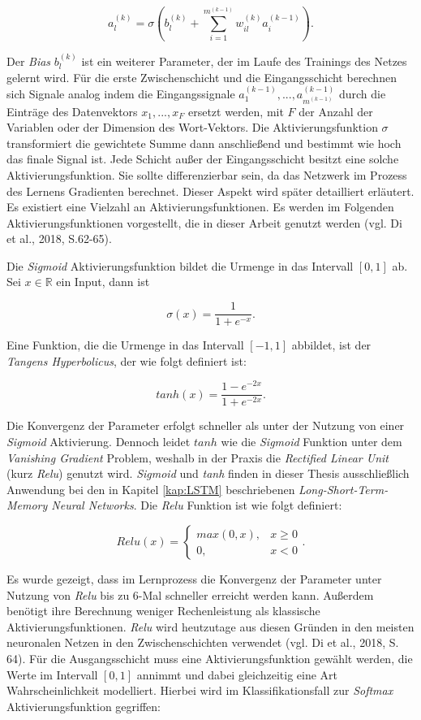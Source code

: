 \documentclass[a4paper,11pt]{article}
\begin{document}
\[ a_{l}^{(k)} = \sigma (b_l^{(k)} + \sum_{i=1}^{m^{(k-1)}} w_{il}^{(k)} a_{i}^{(k-1)}).\]

Der \textit{Bias} $b_l^{(k)}$ ist ein weiterer Parameter, der im Laufe des Trainings des Netzes gelernt wird.
Für die erste Zwischenschicht und die Eingangsschicht berechnen sich Signale analog indem die Eingangssignale $a_{1}^{(k-1)},..., a_{m^{(k-1)}}^{(k-1)}$ durch die Einträge des Datenvektors $x_1, ..., x_F$ ersetzt werden, mit $F$ der Anzahl der Variablen oder der Dimension des Wort-Vektors. Die Aktivierungsfunktion $\sigma$ transformiert die gewichtete Summe dann anschließend und bestimmt wie hoch das finale Signal ist. Jede Schicht außer der Eingangsschicht besitzt eine solche Aktivierungsfunktion. Sie sollte differenzierbar sein, da das Netzwerk im Prozess des Lernens Gradienten berechnet. Dieser Aspekt wird später detailliert erläutert. Es existiert eine Vielzahl an Aktivierungsfunktionen. Es werden im Folgenden Aktivierungsfunktionen vorgestellt, die in dieser Arbeit genutzt werden (vgl. Di et al., 2018, S.62-65). 

Die \textit{Sigmoid} Aktivierungsfunktion bildet die Urmenge in das Intervall $\left[0, 1\right]$ ab. Sei $x \in \mathbb{R}$ ein Input, dann ist 

\[\sigma(x) =  \frac{1}{1+ e^{-x}}.\]

Eine Funktion, die die Urmenge in das Intervall $\left[-1, 1\right]$ abbildet, ist der \textit{Tangens Hyperbolicus}, der wie folgt definiert ist:

\[tanh(x) =  \frac{1- e^{-2x}}{1+ e^{-2x}}.\]


Die Konvergenz der Parameter erfolgt schneller als unter der Nutzung von einer \textit{Sigmoid} Aktivierung. Dennoch leidet $tanh$ wie die \textit{Sigmoid} Funktion unter dem \textit{Vanishing Gradient} Problem, weshalb in der Praxis die \textit{Rectified Linear Unit} (kurz \textit{Relu}) genutzt wird. \textit{Sigmoid} und \textit{tanh} finden in dieser Thesis ausschließlich Anwendung bei den in Kapitel \ref{kap:LSTM} beschriebenen \textit{Long-Short-Term-Memory Neural Networks}. Die \textit{Relu} Funktion ist wie folgt definiert:

\[Relu(x) = 
\begin{cases}
max(0,x), & x \geq 0 \\
0, & x <0
\end{cases}{}
.\]

Es wurde gezeigt, dass im Lernprozess die Konvergenz der Parameter unter Nutzung von \textit{Relu} bis zu 6-Mal schneller erreicht werden kann. Außerdem benötigt ihre Berechnung weniger Rechenleistung als klassische Aktivierungsfunktionen. \textit{Relu} wird heutzutage aus diesen Gründen in den meisten neuronalen Netzen in den Zwischenschichten verwendet (vgl. Di et al., 2018, S. 64). Für die Ausgangsschicht muss eine Aktivierungsfunktion gewählt werden, die Werte im Intervall $\left[0, 1\right]$ annimmt und dabei gleichzeitig eine Art Wahrscheinlichkeit modelliert. Hierbei wird im Klassifikationsfall zur \textit{Softmax} Aktivierungsfunktion gegriffen:
\end{document}
